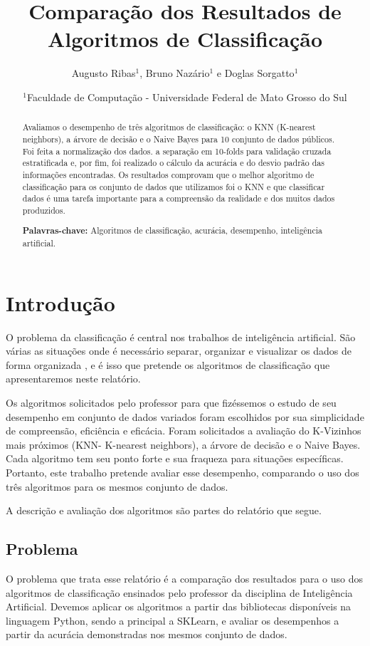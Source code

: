 \documentclass[12pt, a4paper]{article}
\title{Comparação dos Resultados de Algoritmos de Classificação}
\author{Augusto Ribas$^1$, Bruno Nazário$^1$ e Doglas Sorgatto$^1$}
\date{$^1$Faculdade de Computação - Universidade Federal de Mato Grosso do Sul}
\begin{document}
\maketitle

\begin{abstract}
Avaliamos o desempenho de três algoritmos de classificação: o KNN (K-nearest neighbors), a árvore de decisão e o Naive Bayes para 10 conjunto de dados públicos. Foi feita a normalização dos dados. a separação em 10-folds para validação cruzada estratificada e, por fim, foi realizado o cálculo da acurácia e do desvio padrão das informações encontradas. Os resultados comprovam que o melhor algoritmo de classificação para os conjunto de dados que utilizamos foi o KNN e que classificar dados é uma tarefa importante para a compreensão da realidade e dos muitos dados produzidos.

\textbf{Palavras-chave:} Algoritmos de classificação, acurácia, desempenho, inteligência artificial.
\end{abstract}
%
\section{Introdução}
O problema da classificação é central nos trabalhos de inteligência artificial. São várias as situações onde é necessário separar, organizar e visualizar os dados de forma organizada \citep{Mitchell1997}, e é isso que pretende os algoritmos de classificação que apresentaremos neste relatório.

Os algoritmos solicitados pelo professor para que fizéssemos o estudo de seu desempenho em conjunto de dados variados foram escolhidos por sua simplicidade de compreensão, eficiência e eficácia. Foram solicitados a avaliação do K-Vizinhos mais próximos (KNN- K-nearest neighbors), a árvore de decisão e o Naive Bayes. Cada algoritmo tem seu ponto forte e sua fraqueza para situações específicas. Portanto, este trabalho pretende avaliar esse desempenho, comparando o uso dos três algoritmos para os mesmos conjunto de dados.

A descrição e avaliação dos algoritmos são partes do relatório que segue.


\subsection{Problema}
O problema que trata esse relatório é a comparação dos resultados para o uso dos algoritmos de classificação ensinados pelo professor da disciplina de Inteligência Artificial. Devemos aplicar os algoritmos a partir das bibliotecas disponíveis na linguagem Python, sendo a principal a SKLearn, e avaliar os desempenhos a partir da acurácia demonstradas nos mesmos conjunto de dados.
\end{document}
